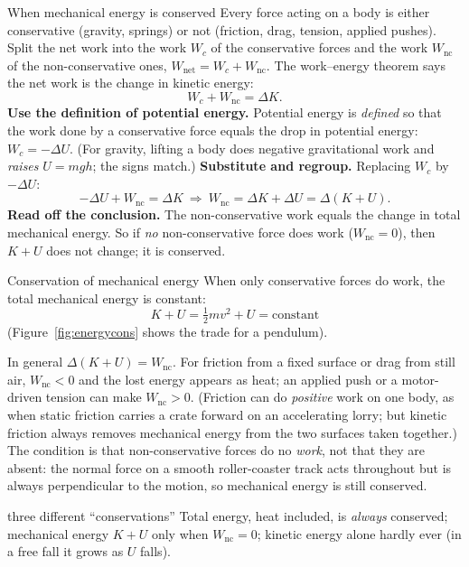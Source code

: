 \begin{derivbox}{When mechanical energy is conserved}
Every force acting on a body is either conservative (gravity, springs) or not (friction, drag, tension,
applied pushes). Split the net work into the work $W_c$ of the conservative forces and the work
$W_{\text{nc}}$ of the non-conservative ones, $W_{\text{net}}=W_c+W_{\text{nc}}$. The work--energy theorem
says the net work is the change in kinetic energy:
\[
W_c+W_{\text{nc}}=\Delta K.
\]
 \textbf{Use the definition of potential energy.} Potential energy is \emph{defined} so that the
work done by a conservative force equals the drop in potential energy: $W_c=-\Delta U$. (For gravity,
lifting a body does negative gravitational work and \emph{raises} $U=mgh$; the signs match.)
 \textbf{Substitute and regroup.} Replacing $W_c$ by $-\Delta U$:
\[
-\Delta U+W_{\text{nc}}=\Delta K\ \Rightarrow\ W_{\text{nc}}=\Delta K+\Delta U=\Delta(K+U).
\]
 \textbf{Read off the conclusion.} The non-conservative work equals the change in total
mechanical energy. So if \emph{no} non-conservative force does work
 ($W_{\text{nc}}=0$), then $K+U$ does
not change; it is conserved.
\end{derivbox}

\begin{keybox}{Conservation of mechanical energy}
When only conservative forces do work, the total mechanical energy is constant:
\[
K+U=\tfrac12 mv^2+U=\text{constant}
\]
(Figure~\ref{fig:energycons} shows the trade for a pendulum).

In general $\Delta(K+U)=W_{\text{nc}}$. For friction from a fixed surface or drag from still air,
$W_{\text{nc}}<0$ and the lost energy appears as heat; an applied push or a motor-driven tension can make
$W_{\text{nc}}>0$. (Friction can do \emph{positive} work on one body, as when static friction
carries a crate forward on an accelerating lorry; but kinetic friction always removes mechanical energy
from the two surfaces taken together.) The condition is that non-conservative forces do no \emph{work},
not that they are absent: the normal force on a smooth roller-coaster track acts throughout but is always
perpendicular to the motion, so mechanical energy is still conserved.
\end{keybox}

\begin{trapbox}{three different ``conservations''}
Total energy, heat included, is \emph{always} conserved; mechanical energy $K+U$ only when
$W_{\text{nc}}=0$; kinetic energy alone hardly ever (in a free fall it grows as $U$ falls).
\end{trapbox}

